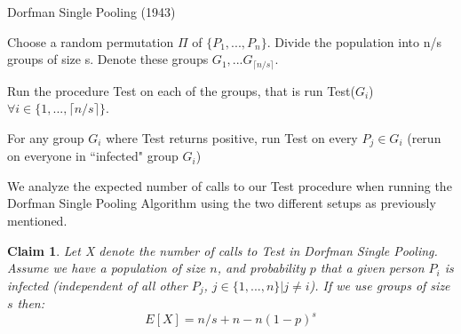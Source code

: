 \documentclass[12pt]{article}
\newtheorem{claim}[theorem]{Claim}
\begin{document}
\LinesNumbered
\begin{algorithm}[ht]
  \caption{Dorfman Single Pooling (1943)\label{alg}}
  Choose a random permutation $\Pi$ of $\{P_1,...,P_n\}$.
  Divide the population into n/s groups of size s. Denote these groups $G_1,...G_{\lceil n/s \rceil}$. 
  
  Run the procedure {\sf Test} on each of the groups, that is run {\sf Test}($G_i$) $\forall i \in \{1,...,{\lceil n/s \rceil}\}$.
  
  For any group $G_i$ where {\sf Test} returns positive, run {\sf Test} on every $P_j \in G_i$ (rerun on everyone in ``infected" group $G_i$)
 
\end{algorithm}

We analyze the expected number of calls to our {\sf Test} procedure when running the Dorfman Single Pooling Algorithm using the two different setups as previously mentioned.

\begin{claim}
Let X denote the number of calls to {\sf Test} in Dorfman Single Pooling. Assume we have a population of size $n$, and probability $p$ that a given person $P_i$ is infected (independent of all other $P_j$, \forall $j \in \{1,...,n\} | j \not= i$). If we use groups of size $s$ then: $$E[X]= n/s + n - n(1-p)^s$$ 

\end{claim}
\end{document}
